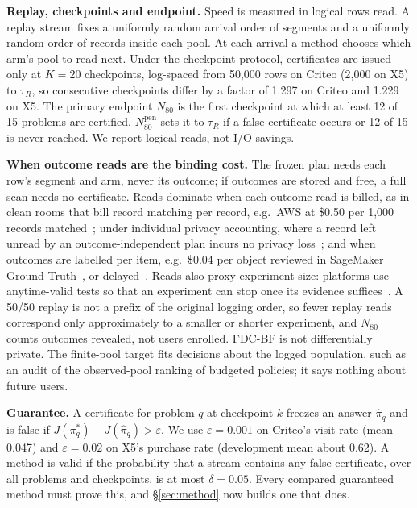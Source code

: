 \documentclass[sigconf,anonymous,review]{acmart}
\newcommand{\eps}{\varepsilon}
\newcommand{\Npen}{N_{80}^{\text{pen}}}
\begin{document}
\textbf{Replay, checkpoints and endpoint.} Speed is measured in logical rows read. A replay stream fixes a uniformly random arrival order of segments and a uniformly random order of records inside each pool. At each arrival a method chooses which arm's pool to read next. Under the checkpoint protocol, certificates are issued only at $K = 20$ checkpoints, log-spaced from 50,000 rows on Criteo (2,000 on X5) to $\tau_R$, so consecutive checkpoints differ by a factor of 1.297 on Criteo and 1.229 on X5. The primary endpoint $N_{80}$ is the first checkpoint at which at least 12 of 15 problems are certified. $\Npen$ sets it to $\tau_R$ if a false certificate occurs or 12 of 15 is never reached. We report logical reads, not I/O savings.

\textbf{When outcome reads are the binding cost.} The frozen plan needs each row's segment and arm, never its outcome; if outcomes are stored and free, a full scan needs no certificate. Reads dominate when each outcome read is billed, as in clean rooms that bill record matching per record, e.g.\ AWS at \$0.50 per 1,000 records matched~\citep{awscleanrooms2026pricing}; under individual privacy accounting, where a record left unread by an outcome-independent plan incurs no privacy loss~\citep{ebadi2015personal,feldman2021individual}; and when outcomes are labelled per item, e.g.\ \$0.04 per object reviewed in SageMaker Ground Truth~\citep{awssagemaker2026pricing}, or delayed~\citep{chapelle2014modeling}. Reads also proxy experiment size: platforms use anytime-valid tests so that an experiment can stop once its evidence suffices~\citep{johari2017peeking,lindon2026anytime,schultzberg2023sequential}. A 50/50 replay is not a prefix of the original logging order, so fewer replay reads correspond only approximately to a smaller or shorter experiment, and $N_{80}$ counts outcomes revealed, not users enrolled. FDC-BF is not differentially private. The finite-pool target fits decisions about the logged population, such as an audit of the observed-pool ranking of budgeted policies; it says nothing about future users.

\textbf{Guarantee.} A certificate for problem $q$ at checkpoint $k$ freezes an answer $\hat\pi_q$ and is false if $J(\pi^*_q) - J(\hat\pi_q) > \eps$. We use $\eps = 0.001$ on Criteo's visit rate (mean 0.047) and $\eps = 0.02$ on X5's purchase rate (development mean about 0.62). A method is valid if the probability that a stream contains any false certificate, over all problems and checkpoints, is at most $\delta = 0.05$. Every compared guaranteed method must prove this, and \S\ref{sec:method} now builds one that does.
\end{document}
